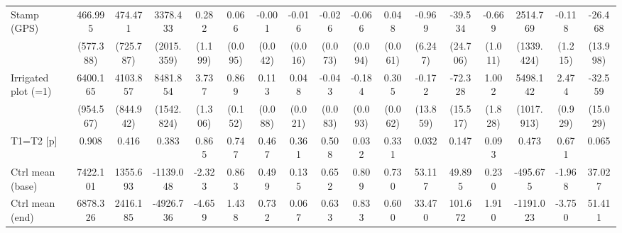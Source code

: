 {\begin{tabular}{l*{16}{c}}
Stamp (GPS)         &     466.995         &     474.471         &    3378.433         &       0.282         &       0.066         &      -0.001         &      -0.016         &      -0.026         &      -0.066         &       0.048         &      -0.969         &     -39.534         &      -0.669         &    2514.769         &      -0.118         &     -26.468         \\
                    &   (577.388)         &   (725.787)         &  (2015.359)         &     (1.199)         &     (0.095)         &     (0.042)         &     (0.016)         &     (0.073)         &     (0.094)         &     (0.061)         &     (6.247)         &    (24.706)         &     (1.011)         &  (1339.424)         &     (1.215)         &    (13.998)         \\
Irrigated plot (=1) &    6400.165\sym{***}&    4103.857\sym{***}&    8481.854\sym{***}&       3.737\sym{**} &       0.869\sym{***}&       0.113         &       0.048\sym{*}  &      -0.043         &      -0.184\sym{*}  &       0.305\sym{***}&      -0.172         &     -72.328\sym{***}&       1.002         &    5498.142\sym{***}&       2.474\sym{**} &     -32.559\sym{*}  \\
                    &   (954.567)         &   (844.942)         &  (1542.824)         &     (1.306)         &     (0.152)         &     (0.088)         &     (0.021)         &     (0.083)         &     (0.093)         &     (0.062)         &    (13.859)         &    (15.517)         &     (1.828)         &  (1017.913)         &     (0.929)         &    (15.029)         \\
\midrule
T1=T2 [p]           &       0.908         &       0.416         &       0.383         &       0.865         &       0.747         &       0.467         &       0.361         &       0.508         &       0.032         &       0.331         &       0.032         &       0.147         &       0.093         &       0.473         &       0.671         &       0.065         \\
Ctrl mean (base)    &    7422.101         &    1355.693         &   -1139.048         &      -2.323         &       0.863         &       0.499         &       0.135         &       0.652         &       0.809         &       0.730         &      53.117         &      49.895         &       0.230         &    -495.675         &      -1.968         &      37.027         \\
Ctrl mean (end)     &    6878.326         &    2416.185         &   -4926.736         &      -4.659         &       1.438         &       0.732         &       0.067         &       0.633         &       0.833         &       0.600         &      33.470         &     101.672         &       1.910         &   -1191.023         &      -3.750         &      51.411         \\

\end{tabular}}

